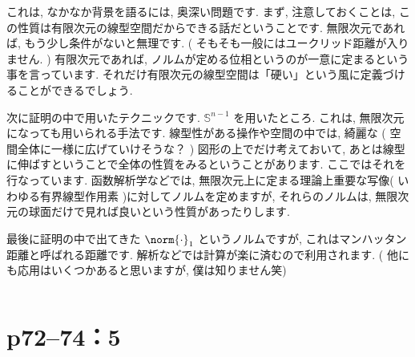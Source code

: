 \documentclass[a4paper,10pt,fleqn]{ltjsarticle}
\begin{document}
\begin{column}
    これは, なかなか背景を語るには, 奥深い問題です. まず, 注意しておくことは, この性質は有限次元の線型空間だからできる話だということです. 無限次元であれば, もう少し条件がないと無理です. ( そもそも一般にはユークリッド距離が入りません. ) 有限次元であれば, ノルムが定める位相というのが一意に定まるという事を言っています. それだけ有限次元の線型空間は「硬い」という風に定義づけることができるでしょう.

    次に証明の中で用いたテクニックです.  $\mathbb{S}^{n-1}$ を用いたところ. これは, 無限次元になっても用いられる手法です. 線型性がある操作や空間の中では, 綺麗な ( 空間全体に一様に広げていけそうな？ ) 図形の上でだけ考えておいて, あとは線型に伸ばすということで全体の性質をみるということがあります. ここではそれを行なっています. 函数解析学などでは, 無限次元上に定まる理論上重要な写像( いわゆる有界線型作用素 )に対してノルムを定めますが, それらのノルムは, 無限次元の球面だけで見れば良いという性質があったりします.

    最後に証明の中で出てきた $\norm{ \cdot } _ 1$ というノルムですが, これはマンハッタン距離と呼ばれる距離です. 解析などでは計算が楽に済むので利用されます. ( 他にも応用はいくつかあると思いますが, 僕は知りません笑)
\end{column}
\newpage

\section*{p72--74：5}
\end{document}
